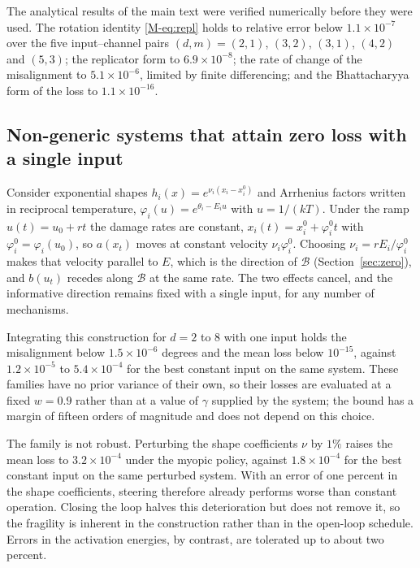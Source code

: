 \documentclass[12pt]{article}
\begin{document}
The analytical results of the main text were verified numerically before
they were used. The rotation identity \eqref{M-eq:repl} holds to
relative error below $1.1\times10^{-7}$ over the five input--channel pairs
$(d,m)=(2,1)$, $(3,2)$, $(3,1)$, $(4,2)$ and $(5,3)$; the replicator form to
$6.9\times10^{-8}$; the rate of change of the misalignment to $5.1\times10^{-6}$, limited by
finite differencing; and the Bhattacharyya form of the loss to $1.1\times10^{-16}$.

\subsection{Non-generic systems that attain zero loss with a single input}

Consider exponential shapes $h_i(x)=e^{\nu_i(x_i-x_i^0)}$ and Arrhenius
factors written in reciprocal temperature, $\varphi_i(u)=e^{\theta_i-E_iu}$
with $u=1/(kT)$. Under the ramp $u(t)=u_0+rt$ the damage rates are constant,
$x_i(t)=x_i^0+\varphi_i^0t$ with $\varphi_i^0=\varphi_i(u_0)$, so $a(x_t)$
moves at constant velocity $\nu_i\varphi_i^0$. Choosing
$\nu_i=rE_i/\varphi_i^0$ makes that velocity parallel to $E$, which is the
direction of $\mathcal B$ (Section~\ref{sec:zero}), and $b(u_t)$ recedes along $\mathcal B$ at the same
rate. The two effects cancel, and the informative direction remains fixed
with a single input, for any number of mechanisms.

Integrating this construction
for $d=2$ to $8$ with one input holds the misalignment below
$1.5\times10^{-6}$ degrees and the mean loss below $10^{-15}$, against
$1.2\times10^{-5}$ to $5.4\times10^{-4}$ for the best constant input on the
same system. These families have no prior variance of their own, so their losses are evaluated at a fixed $w=0.9$ rather than at a value of $\gamma$ supplied by the system; the bound has a margin of fifteen orders of magnitude and does not depend on this choice.

The family is not robust. Perturbing the shape coefficients $\nu$ by $1\%$ raises the mean loss to
$3.2\times10^{-4}$ under the myopic policy, against $1.8\times10^{-4}$ for the
best constant input on the same perturbed system. With an error of one percent
in the shape coefficients, steering therefore already performs worse than
constant operation. Closing the loop halves this deterioration but does not
remove it, so the fragility is inherent in the construction rather than in
the open-loop schedule. Errors in the activation energies, by contrast, are
tolerated up to about two percent.
\end{document}
